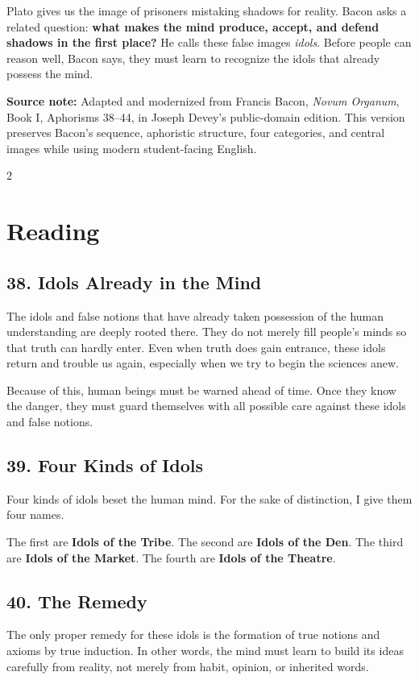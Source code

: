 \documentclass[12pt]{article}
\newcommand{\focusbox}[1]{%
\vspace{0.4em}\noindent\colorbox{gray!12}{\begin{minipage}{0.96\linewidth}#1\end{minipage}}\vspace{0.5em}}
\begin{document}
Plato gives us the image of prisoners mistaking shadows for reality. Bacon asks a related question: \textbf{what makes the mind produce, accept, and defend shadows in the first place?} He calls these false images \textit{idols}. Before people can reason well, Bacon says, they must learn to recognize the idols that already possess the mind.

\focusbox{\textbf{Source note:} Adapted and modernized from Francis Bacon, \textit{Novum Organum}, Book I, Aphorisms 38--44, in Joseph Devey's public-domain edition. This version preserves Bacon's sequence, aphoristic structure, four categories, and central images while using modern student-facing English.}

\begin{multicols}{2}
\section*{Reading}

\subsection*{38. Idols Already in the Mind}
The idols and false notions that have already taken possession of the human understanding are deeply rooted there. They do not merely fill people's minds so that truth can hardly enter. Even when truth does gain entrance, these idols return and trouble us again, especially when we try to begin the sciences anew.

Because of this, human beings must be warned ahead of time. Once they know the danger, they must guard themselves with all possible care against these idols and false notions.

\subsection*{39. Four Kinds of Idols}
Four kinds of idols beset the human mind. For the sake of distinction, I give them four names.

The first are \textbf{Idols of the Tribe}. The second are \textbf{Idols of the Den}. The third are \textbf{Idols of the Market}. The fourth are \textbf{Idols of the Theatre}.

\subsection*{40. The Remedy}
The only proper remedy for these idols is the formation of true notions and axioms by true induction. In other words, the mind must learn to build its ideas carefully from reality, not merely from habit, opinion, or inherited words.


\end{multicols}
\end{document}
